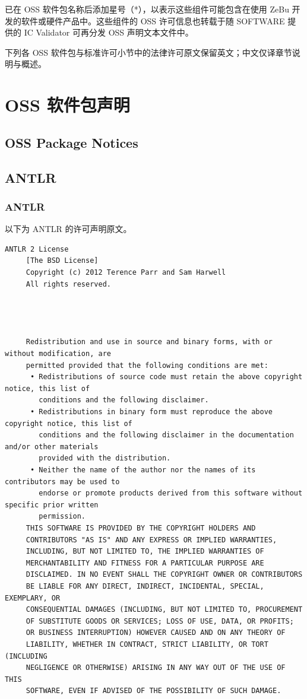已在 OSS 软件包名称后添加星号（*），以表示这些组件可能包含在使用 ZeBu 开发的软件或硬件产品中。这些组件的 OSS 许可信息也转载于随 SOFTWARE 提供的 IC Validator 可再分发 OSS 声明文本文件中。

\begin{noteBox}
下列各 OSS 软件包与标准许可小节中的法律许可原文保留英文；中文仅译章节说明与概述。
\end{noteBox}

\section{OSS 软件包声明}
\subsection*{OSS Package Notices}

\subsection{ANTLR}
\subsubsection*{ANTLR}

以下为 ANTLR 的许可声明原文。

\begin{lstlisting}[basicstyle=\ttfamily\footnotesize,breaklines=true]
     ANTLR 2 License
     [The BSD License]
     Copyright (c) 2012 Terence Parr and Sam Harwell
     All rights reserved.




     Redistribution and use in source and binary forms, with or without modification, are
     permitted provided that the following conditions are met:
      • Redistributions of source code must retain the above copyright notice, this list of
        conditions and the following disclaimer.
      • Redistributions in binary form must reproduce the above copyright notice, this list of
        conditions and the following disclaimer in the documentation and/or other materials
        provided with the distribution.
      • Neither the name of the author nor the names of its contributors may be used to
        endorse or promote products derived from this software without specific prior written
        permission.
     THIS SOFTWARE IS PROVIDED BY THE COPYRIGHT HOLDERS AND
     CONTRIBUTORS "AS IS" AND ANY EXPRESS OR IMPLIED WARRANTIES,
     INCLUDING, BUT NOT LIMITED TO, THE IMPLIED WARRANTIES OF
     MERCHANTABILITY AND FITNESS FOR A PARTICULAR PURPOSE ARE
     DISCLAIMED. IN NO EVENT SHALL THE COPYRIGHT OWNER OR CONTRIBUTORS
     BE LIABLE FOR ANY DIRECT, INDIRECT, INCIDENTAL, SPECIAL, EXEMPLARY, OR
     CONSEQUENTIAL DAMAGES (INCLUDING, BUT NOT LIMITED TO, PROCUREMENT
     OF SUBSTITUTE GOODS OR SERVICES; LOSS OF USE, DATA, OR PROFITS;
     OR BUSINESS INTERRUPTION) HOWEVER CAUSED AND ON ANY THEORY OF
     LIABILITY, WHETHER IN CONTRACT, STRICT LIABILITY, OR TORT (INCLUDING
     NEGLIGENCE OR OTHERWISE) ARISING IN ANY WAY OUT OF THE USE OF THIS
     SOFTWARE, EVEN IF ADVISED OF THE POSSIBILITY OF SUCH DAMAGE.
\end{lstlisting}

